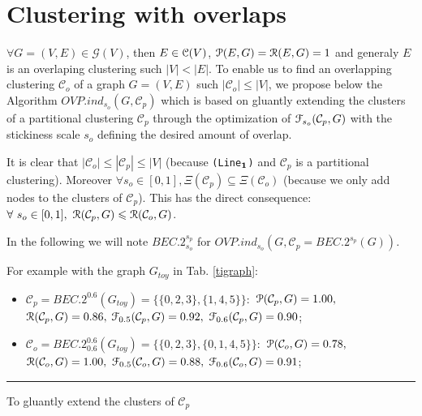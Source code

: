 \documentclass[12pt]{article}
\theoremstyle{thmstyleone}%
\theoremstyle{definition}
\begin{document}
\section{Clustering with overlaps \label{SecOverlaps}}
$\forall G=(V,E) \in \mathcal{G}(V)$, then $E \in \EuScript{C}(V)$, $\EuScript{P}(E,G)=\EuScript{R}(E,G)=1$ and
generaly $E$ is an overlaping clustering such $|V| < |E|$.
%
To enable us to find an overlapping clustering $\mathcal{C}_o$ of a graph $G=(V,E)$ such $|\mathcal{C}_o| \leqslant |V|$, we propose below the Algorithm $OVP.ind_{s_{o}}(G, \mathcal{C}_{p})$ which is based on gluantly extending the clusters of a partitional clustering $\mathcal{C}_{p}$ through the optimization of $\EuScript{F}_{s_{o}}(\mathcal{C}_p, G)$ with the stickiness scale $s_{o}$ defining the desired amount of overlap.

It is clear that $|\mathcal{C}_{o}| \leqslant |\mathcal{C}_{p}| \leqslant |V|$ (because \texttt{{(Line$\bf_1$)}} and $\mathcal{C}_{p}$ is a partitional clustering).
Moreover
$\forall s_{o} \in [0,1], {\Xi}(\mathcal{C}_{p}) \subseteq {\Xi}(\mathcal{C}_{o})$ (because we only add nodes to the clusters of $\mathcal{C}_{p}$).
This has the direct consequence: $ \forall~s_{o} \in [0,1],~\EuScript{R}(\mathcal{C}_{p}, G) \leqslant \EuScript{R}(\mathcal{C}_{o}, G)$.

In the following we will note $BEC.2^{s_p}_{s_o}$ for $OVP.ind_{s_o}(G, \mathcal{C}_{p}=BEC.2^{s_p}(G))$.

For example with the graph $G_{toy}$ in Tab. \ref{tigraph}:

\begin{itemize}
 \item $\mathcal{C}_{p}=BEC.2^{0.6}(G_{toy})=\big\{\{0, 2, 3\}, \{1, 4, 5\}\big\}:$
 $\EuScript{P}(\mathcal{C}_{p}, G)=1.00,$
 $\EuScript{R}(\mathcal{C}_{p}, G)=0.86,$
 $\EuScript{F}_{0.5}(\mathcal{C}_{p}, G)=0.92,$
 $\EuScript{F}_{0.6}(\mathcal{C}_{p}, G)=0.90$;

 \item $\mathcal{C}_{o}=BEC.2^{0.6}_{0.6}(G_{toy})=\big\{\{0, 2, 3\}, \{0, 1, 4, 5\}\big\}:$
 $\EuScript{P}(\mathcal{C}_{o}, G)=0.78,$
 $\EuScript{R}(\mathcal{C}_{o}, G)=1.00,$
 $\EuScript{F}_{0.5}(\mathcal{C}_{o}, G)=0.88,$
 $\EuScript{F}_{0.6}(\mathcal{C}_{o}, G)=0.91$;
\end{itemize}

\noindent
\rule{16cm}{0.05cm}

 To gluantly extend the clusters of $\mathcal{C}_{p}$
\end{document}
